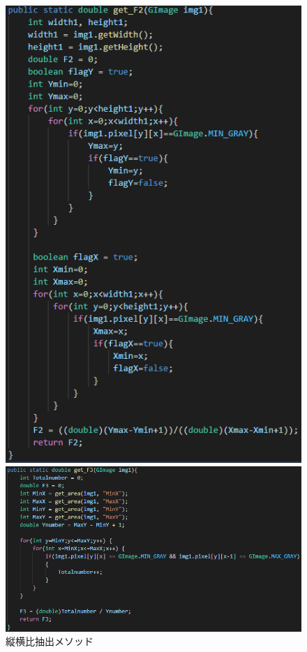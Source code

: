 \begin{enumerate}
\begin{itemize}
\begin{itemize}
\begin{figure}[htbp]
\begin{minipage}[t]{0.45\hsize}
          \includegraphics[scale=0.25]{縦横比抽出1.PNG}
          \centering
          \caption{縦横比抽出メソッド}
          \label{graph:6}
        \end{minipage}
        \begin{minipage}[t]{0.45\hsize}
          \includegraphics[scale=0.3]{水平方向ラン数平均抽出1.PNG}

\end{minipage}
\end{figure}
\end{itemize}
\end{itemize}
\end{enumerate}
